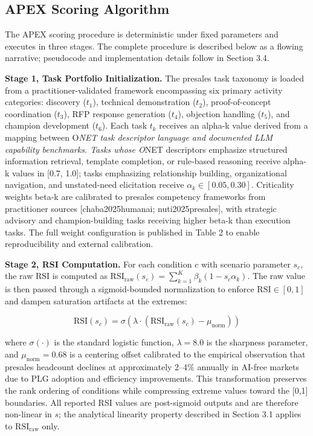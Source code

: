 \documentclass[10pt, conference]{IEEEtran}
\begin{document}
\subsection{APEX Scoring Algorithm}

\label{sec:apex_scoring_algorithm}

The APEX scoring procedure is deterministic under fixed parameters and executes in three stages. The complete procedure is described below as a flowing narrative; pseudocode and implementation details follow in Section 3.4.

\textbf{Stage 1, Task Portfolio Initialization.} The presales task taxonomy is loaded from a practitioner-validated framework encompassing six primary activity categories: discovery ($t_1$), technical demonstration ($t_2$), proof-of-concept coordination ($t_3$), RFP response generation ($t_4$), objection handling ($t_5$), and champion development ($t_6$). Each task $t_k$ receives an alpha-k value derived from a mapping between O\textit{NET task descriptor language and documented LLM capability benchmarks. Tasks whose O}NET descriptors emphasize structured information retrieval, template completion, or rule-based reasoning receive alpha-k values in [0.7, 1.0]; tasks emphasizing relationship building, organizational navigation, and unstated-need elicitation receive $\alpha_k \in [0.05, 0.30]$. Criticality weights beta-k are calibrated to presales competency frameworks from practitioner sources [chaba2025humanai; nuti2025presales], with strategic advisory and champion-building tasks receiving higher beta-k than execution tasks. The full weight configuration is published in Table 2 to enable reproducibility and external calibration.

\textbf{Stage 2, RSI Computation.} For each condition $c$ with scenario parameter $s_c$, the raw RSI is computed as $\text{RSI}_{\text{raw}}(s_c) = \sum_{k=1}^{K} \beta_k (1 - s_c \alpha_k)$. The raw value is then passed through a sigmoid-bounded normalization to enforce $\text{RSI} \in [0,1]$ and dampen saturation artifacts at the extremes:

\begin{equation}
\text{RSI}(s_c) = \sigma\!\left(\lambda \cdot \left(\text{RSI}_{\text{raw}}(s_c) - \mu_{\text{norm}}\right)\right)
\end{equation}

where $\sigma(\cdot)$ is the standard logistic function, $\lambda = 8.0$ is the sharpness parameter, and $\mu_{\text{norm}} = 0.68$ is a centering offset calibrated to the empirical observation that presales headcount declines at approximately 2--4\% annually in AI-free markets due to PLG adoption and efficiency improvements. This transformation preserves the rank ordering of conditions while compressing extreme values toward the [0,1] boundaries. All reported RSI values are post-sigmoid outputs and are therefore non-linear in $s$; the analytical linearity property described in Section 3.1 applies to $\text{RSI}_{\text{raw}}$ only.
\end{document}

